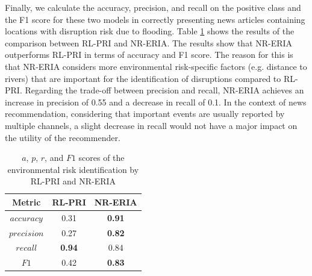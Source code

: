 \documentclass[]{ceurart}
\begin{document}
Finally, we calculate the accuracy, precision, and recall on the positive class and the F1 score for these two models \cite{ting2017encyclopedia} in correctly presenting news articles containing locations with disruption risk due to flooding. Table \ref{tab:RL-ERIA e5} shows the results of the comparison between RL-PRI and NR-ERIA. The results show that NR-ERIA outperforms RL-PRI in terms of accuracy and F1 score. The reason for this is that NR-ERIA considers more environmental risk-specific factors (e.g. distance to rivers) that are important for the identification of disruptions compared to RL-PRI. 
Regarding the trade-off between precision and recall, NR-ERIA achieves an increase in precision of 0.55 and a decrease in recall of 0.1. In the context of news recommendation, considering that important events are usually reported by multiple channels, a slight decrease in recall would not have a major impact on the utility of the recommender.

\begin{table}[h]
\caption{$a$, $p$, $r$, and $F1$ scores of the environmental risk identification by RL-PRI and NR-ERIA}
\label{tab:RL-ERIA e5}
  \centering
  \begin{tabular}{ccc}
    \toprule
    \textbf{Metric} &\textbf{ RL-PRI} & \textbf{NR-ERIA} \\
    \midrule
  $accuracy$ & 0.31 & \textbf{0.91}\\
 $precision$ & 0.27 & \textbf{0.82}\\
 $recall$ & \textbf{0.94} & 0.84\\
 $F1$ & 0.42 & \textbf{0.83}\\
    \bottomrule
  \end{tabular}
\end{table}
\end{document}
